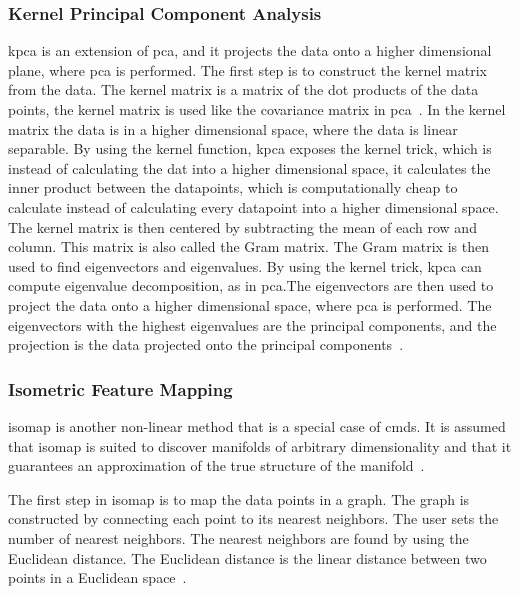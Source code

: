 \subsubsection{Kernel Principal Component Analysis}\label{subsubsec:kernel-principal-component-analysis}
\gls{kpca} is an extension of \gls{pca}, and it projects the data onto a higher dimensional plane, where \gls{pca} is performed.
The first step is to construct the kernel matrix from the data. The kernel matrix is a matrix of the dot products of the data points, the kernel matrix is used like the covariance matrix in \gls{pca}~\cite{kernel-pca}. In the kernel matrix the data is in a higher dimensional space, where the data is linear separable. By using the kernel function, \gls{kpca} exposes the kernel trick, which is instead of calculating the dat into a higher dimensional space, it calculates the inner product between the datapoints, which is computationally cheap to calculate instead of calculating every datapoint into a higher dimensional space.
The kernel matrix is then centered by subtracting the mean of each row and column. This matrix is also called the Gram matrix. The Gram matrix is then used to find eigenvectors and eigenvalues. By using the kernel trick, \gls{kpca} can compute eigenvalue decomposition, as in \gls{pca}.The eigenvectors are then used to project the data onto a higher dimensional space, where \gls{pca} is performed. The eigenvectors with the highest eigenvalues are the principal components, and the projection is the data projected onto the principal components~\cite{kernel-pca}.

\subsubsection{Isometric Feature Mapping}\label{subsubsec:isometric-feature-mapping}
\gls{isomap} is another non-linear method that is a special case of \gls{cmds}. It is assumed that \gls{isomap} is suited to discover manifolds of arbitrary dimensionality and that it guarantees an approximation of the true structure of the manifold~\cite{tennenbaum}.

The first step in \gls{isomap} is to map the data points in a graph. The graph is constructed by connecting each point to its nearest neighbors. The user sets the number of nearest neighbors. The nearest neighbors are found by using the Euclidean distance. The Euclidean distance is the linear distance between two points in a Euclidean space~\cite{Multidimensional-Scaling-Sammon-Mapping-and-Isomap}.


